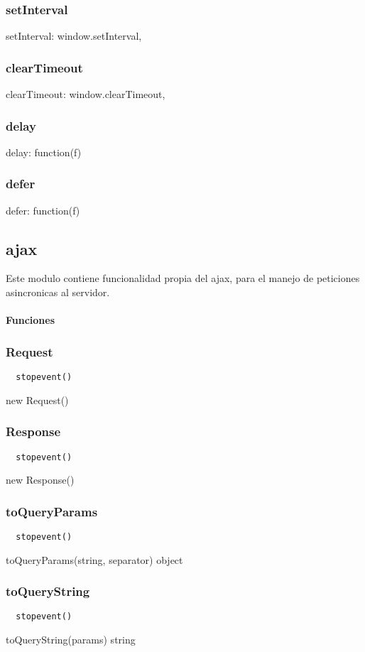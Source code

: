 \subsubsection*{setInterval}
setInterval: window.setInterval,
\subsubsection*{clearTimeout}
clearTimeout: window.clearTimeout,
\subsubsection*{delay}
delay: function(f) {
\subsubsection*{defer}
defer: function(f) {

\subsection{ajax}
Este modulo contiene funcionalidad propia del ajax, para el manejo de peticiones asincronicas al servidor.
\paragraph{Funciones}
\subsubsection*{Request}
\begin{verbatim}
  stopevent()
\end{verbatim}
new Request()
\subsubsection*{Response}
\begin{verbatim}
  stopevent()
\end{verbatim}
new Response()
\subsubsection*{toQueryParams}
\begin{verbatim}
  stopevent()
\end{verbatim}
toQueryParams(string, separator) \rightarrow object
\subsubsection*{toQueryString}
\begin{verbatim}
  stopevent()
\end{verbatim}
toQueryString(params) \rightarrow string

}}
